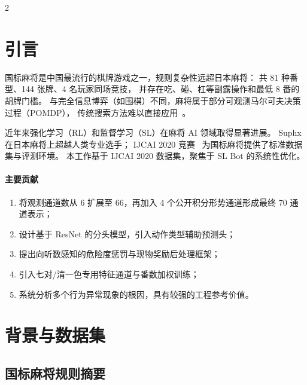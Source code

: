 \documentclass{article}
\begin{document}
\vspace{-4pt}
\begin{multicols}{2}

\section{引言}
\label{sec:intro}

国标麻将是中国最流行的棋牌游戏之一，规则复杂性远超日本麻将：
共 81 种番型、144 张牌、4 名玩家同场竞技，
并存在吃、碰、杠等副露操作和最低 8 番的胡牌门槛。
与完全信息博弈（如围棋）不同，麻将属于部分可观测马尔可夫决策过程（POMDP），
传统搜索方法难以直接应用~\cite{silver2016mastering}。

近年来强化学习（RL）和监督学习（SL）在麻将 AI 领域取得显著进展。
Suphx~\cite{li2020suphx} 在日本麻将上超越人类专业选手；
IJCAI 2020 竞赛~\cite{ijcai2020} 为国标麻将提供了标准数据集与评测环境。
本工作基于 IJCAI 2020 数据集，聚焦于 SL Bot 的系统性优化。

\paragraph{主要贡献}
\begin{enumerate}[leftmargin=*,topsep=2pt,itemsep=1pt,parsep=0pt]
  \item 将观测通道数从 6 扩展至 66，再加入 4 个公开积分形势通道形成最终 70 通道表示；
  \item 设计基于 ResNet 的分头模型，引入动作类型辅助预测头；
  \item 提出向听数感知的危险度惩罚与现物奖励后处理框架；
  \item 引入七对/清一色专用特征通道与番数加权训练；
  \item 系统分析多个行为异常现象的根因，具有较强的工程参考价值。
\end{enumerate}

\section{背景与数据集}
\label{sec:background}

\subsection{国标麻将规则摘要}


\end{multicols}
\end{document}
